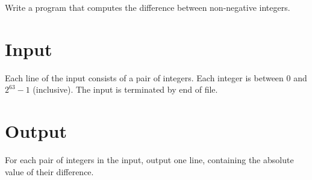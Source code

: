 
Write a program that computes the difference between non-negative integers.

\section*{Input}

Each line of the input consists of a pair of integers. Each integer is
between $0$ and $2^{63}-1$ (inclusive).  The input is terminated by end of file.

\section*{Output}

For each pair of integers in the input, output one line, containing the absolute value of their difference. 
